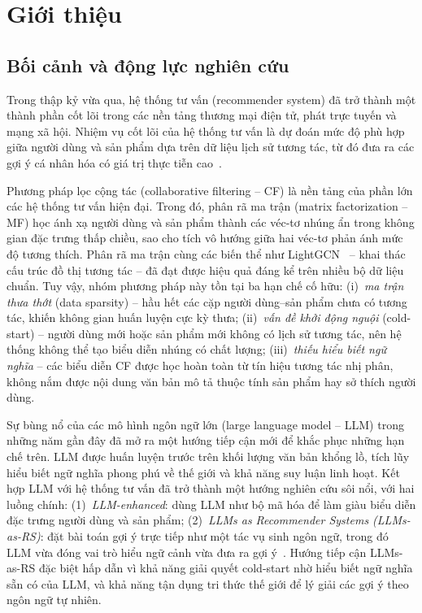 \chapter{Giới thiệu}
\label{Chapter1}

\section{Bối cảnh và động lực nghiên cứu}
\label{sec:boi-canh}

Trong thập kỷ vừa qua, hệ thống tư vấn (recommender system) đã trở thành một thành phần
cốt lõi trong các nền tảng thương mại điện tử, phát trực tuyến và mạng xã hội. Nhiệm vụ
cốt lõi của hệ thống tư vấn là dự đoán mức độ phù hợp giữa người dùng và sản phẩm dựa
trên dữ liệu lịch sử tương tác, từ đó đưa ra các gợi ý cá nhân hóa có giá trị thực tiễn
cao~\cite{zhang2019deep}.

Phương pháp lọc cộng tác (collaborative filtering -- CF) là nền tảng của phần lớn các hệ
thống tư vấn hiện đại. Trong đó, phân rã ma trận (matrix factorization -- MF)
\cite{mf2009} học ánh xạ người dùng và sản phẩm thành các véc-tơ nhúng ẩn trong không
gian đặc trưng thấp chiều, sao cho tích vô hướng giữa hai véc-tơ phản ánh mức độ tương
thích. Phân rã ma trận cùng các biến thể như LightGCN~\cite{lightgcn2020} -- khai thác
cấu trúc đồ thị tương tác -- đã đạt được hiệu quả đáng kể trên nhiều bộ dữ liệu chuẩn.
Tuy vậy, nhóm phương pháp này tồn tại ba hạn chế cố hữu: (i)~\textit{ma trận thưa thớt}
(data sparsity) -- hầu hết các cặp người dùng--sản phẩm chưa có tương tác, khiến không
gian huấn luyện cực kỳ thưa; (ii)~\textit{vấn đề khởi động nguội} (cold-start) -- người
dùng mới hoặc sản phẩm mới không có lịch sử tương tác, nên hệ thống không thể tạo biểu
diễn nhúng có chất lượng; (iii)~\textit{thiếu hiểu biết ngữ nghĩa} -- các biểu diễn CF
được học hoàn toàn từ tín hiệu tương tác nhị phân, không nắm được nội dung văn bản mô tả
thuộc tính sản phẩm hay sở thích người dùng.

Sự bùng nổ của các mô hình ngôn ngữ lớn (large language model -- LLM) trong những năm
gần đây đã mở ra một hướng tiếp cận mới để khắc phục những hạn chế trên. LLM được huấn
luyện trước trên khối lượng văn bản khổng lồ, tích lũy hiểu biết ngữ nghĩa phong phú về
thế giới và khả năng suy luận linh hoạt. Kết hợp LLM với hệ thống tư vấn đã trở thành
một hướng nghiên cứu sôi nổi, với hai luồng chính: (1)~\textit{LLM-enhanced}: dùng LLM
như bộ mã hóa để làm giàu biểu diễn đặc trưng người dùng và sản phẩm; (2)~\textit{LLMs
as Recommender Systems (LLMs-as-RS)}: đặt bài toán gợi ý trực tiếp như một tác vụ sinh
ngôn ngữ, trong đó LLM vừa đóng vai trò hiểu ngữ cảnh vừa đưa ra gợi ý~\cite{llmrec2023}.
Hướng tiếp cận LLMs-as-RS đặc biệt hấp dẫn vì khả năng giải quyết cold-start nhờ hiểu
biết ngữ nghĩa sẵn có của LLM, và khả năng tận dụng tri thức thế giới để lý giải các
gợi ý theo ngôn ngữ tự nhiên.


